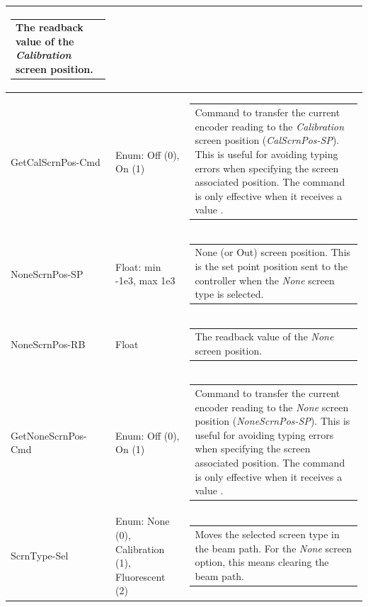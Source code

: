 \documentclass[openany]{article}
\begin{document}
\begin{longtable}{| m{4.5cm} m{2.5cm}  m{7.0cm} |}
\begin{tabular}{@{}m{6cm}@{}}
                The readback value of the \emph{Calibration} screen position.
            \end{tabular} \hypertarget{pv:get-cal-scrn-pos-cmd}{}\\ \hline
        GetCalScrnPos-Cmd & Enum: Off (0), On (1) & \begin{tabular}{@{}m{6cm}@{}}
                Command to transfer the current encoder reading to the \emph{Calibration} screen position (\emph{CalScrnPos-SP}). This is useful for avoiding typing errors when specifying the screen associated position. The command is only effective when it receives a value $\neq 0$.
            \end{tabular} \hypertarget{pv:none-scrn-pos}{}\\ \hline
        NoneScrnPos-SP & Float: min -1e3, max 1e3 & \begin{tabular}{@{}m{6cm}@{}}
                None (or Out) screen position. This is the set point position sent to the controller when the \emph{None} screen type is selected.
            \end{tabular} \hypertarget{}{}\\ \hline
        NoneScrnPos-RB & Float & \begin{tabular}{@{}m{6cm}@{}}
                The readback value of the \emph{None} screen position.
            \end{tabular} \hypertarget{pv:get-none-scrn-pos-cmd}{}\\ \hline
        GetNoneScrnPos-Cmd & Enum: Off (0), On (1) & \begin{tabular}{@{}m{6cm}@{}}
                Command to transfer the current encoder reading to the \emph{None} screen position (\emph{NoneScrnPos-SP}). This is useful for avoiding typing errors when specifying the screen associated position. The command is only effective when it receives a value $\neq 0$.
            \end{tabular} \hypertarget{pv:scrn-type}{}\\ \hline
        ScrnType-Sel & Enum: None (0), Calibration (1), Fluorescent (2) & \begin{tabular}{@{}m{6cm}@{}}
                Moves the selected screen type in the beam path. For the \emph{None} screen option, this means clearing the beam path.
            \end{tabular} \hypertarget{}{}\\ \hline

\end{longtable}
\end{document}
